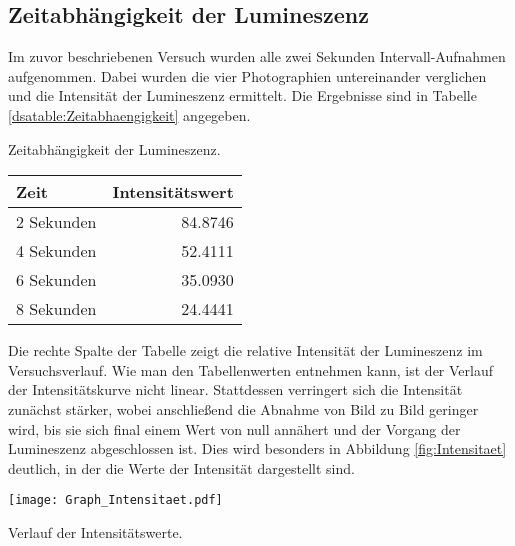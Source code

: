\subsection{Zeitabhängigkeit der Lumineszenz} 

Im zuvor beschriebenen Versuch wurden alle zwei Sekunden Intervall-Aufnahmen aufgenommen. Dabei wurden die vier Photographien untereinander verglichen und die Intensität der Lumineszenz ermittelt. Die Ergebnisse sind in Tabelle \ref{dsatable:Zeitabhaengigkeit} angegeben.

\begin{dsatable}
 \caption{Zeitabhängigkeit der Lumineszenz.}
 \centering
 \begin{tabular}{lr} %
  \toprule
  Zeit &  Intensitätswert\\
  \midrule
  2 Sekunden      & 84.8746\\
  4 Sekunden      & 52.4111\\
  6 Sekunden      & 35.0930\\
  8 Sekunden      & 24.4441\\
  \bottomrule
 \end{tabular}
 \label{dsatable:Zeitabhaengigkeit}
\end{dsatable}


Die rechte Spalte der Tabelle zeigt die relative Intensität der Lumineszenz im Versuchsverlauf. Wie man den Tabellenwerten entnehmen kann, ist der Verlauf der Intensitätskurve nicht linear. Stattdessen verringert sich die Intensität zunächst stärker, wobei anschließend die Abnahme von Bild zu Bild geringer wird, bis sie sich final einem Wert von null annähert und der Vorgang der Lumineszenz abgeschlossen ist.
Dies wird besonders in Abbildung \ref{fig:Intensitaet} deutlich, in der die Werte der Intensität dargestellt sind.

\begin{dsafigure}
 \centering
 \texttt{[image: Graph\_Intensitaet.pdf]}
 \caption{Verlauf der Intensitätswerte.}
 \label{fig:Intensitaet}
\end{dsafigure}


